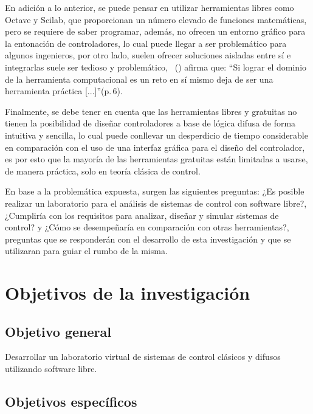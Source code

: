 	En adición a lo anterior, se puede pensar en utilizar herramientas libres como Octave y Scilab, que proporcionan un número elevado de funciones matemáticas, pero se requiere de saber programar, además, no ofrecen un entorno gráfico para la entonación de controladores, lo cual puede llegar a ser problemático para algunos ingenieros, por otro lado, suelen ofrecer soluciones aisladas entre sí e integrarlas suele ser tedioso y problemático, \citeauthor{Suarez}~(\citeyear{Suarez}) afirma que: \enquote{Si lograr el dominio de la herramienta computacional es un reto en sí mismo deja de ser una herramienta práctica [...]}(p.$\,$6).
	
	Finalmente, se debe tener en cuenta que las herramientas libres y gratuitas no tienen la posibilidad de diseñar controladores a base de lógica difusa de forma intuitiva y sencilla, lo cual puede conllevar un desperdicio de tiempo considerable en comparación con el uso de una interfaz gráfica para el diseño del controlador, es por esto que la mayoría de las herramientas gratuitas están limitadas a usarse, de manera práctica, solo en teoría clásica de control. 
	
	En base a la problemática expuesta, surgen las siguientes preguntas: ¿Es posible realizar un laboratorio para el análisis de sistemas de control con software libre?, ¿Cumpliría con los requisitos para analizar, diseñar y simular sistemas de control? y ¿Cómo se desempeñaría en comparación con otras herramientas?, preguntas que se responderán con el desarrollo de esta investigación y que se utilizaran para guiar el rumbo de la misma.
	
\section{Objetivos de la investigación}
	
	\subsection{Objetivo general}
		
		Desarrollar un laboratorio virtual de sistemas de control clásicos y difusos utilizando software libre.
		
	\subsection{Objetivos específicos}
		
